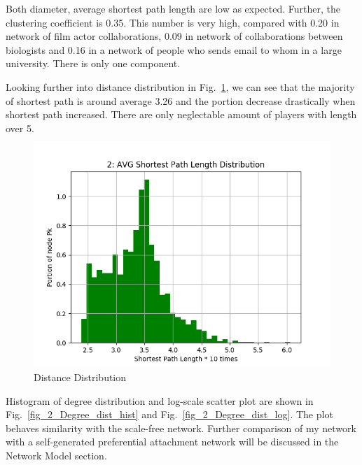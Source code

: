 \documentclass[runningheads]{llncs}
\begin{document}
Both diameter, average shortest path length are low as expected. Further, the clustering coefficient is 0.35. This number is very high, compared with 0.20 in network of film actor collaborations, 0.09 in network of collaborations between biologists and 0.16 in a network of people who sends email to whom in a large university. There is only one component.

Looking further into distance distribution in Fig.~\ref{fig_2_distance_distribution_hist}, we can see that the majority of shortest path is around average 3.26 and the portion decrease drastically when shortest path increased. There are only neglectable amount of players with length over 5.

\begin{figure}[H]
\centering
\includegraphics[scale=0.5]{2_distance_distribution_hist}
\caption{Distance Distribution} \label{fig_2_distance_distribution_hist}
\end{figure}


Histogram of degree distribution and log-scale scatter plot are shown in  Fig.~\ref{fig_2_Degree_dist_hist} and Fig.~\ref{fig_2_Degree_dist_log}. The plot behaves similarity with the scale-free network. Further comparison of my network with  a self-generated preferential attachment network will be discussed in the Network Model
 section. 
 
\end{document}
